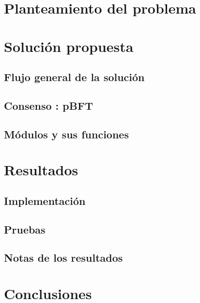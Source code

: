 \documentclass{report}
\begin{document}

    \tableofcontents

    \chapter{\LARGE{Planteamiento del problema}}
    


    \chapter{\LARGE{Solución propuesta}}

    \section{\Large{Flujo general de la solución}}
    

    \section{\Large{Consenso : pBFT}}
    

    \section{\Large{Módulos y sus funciones}}
    
    
    \chapter{\LARGE{Resultados}}

    \section{\Large{Implementación}}
    

    \section{\Large{Pruebas}}
    

    \section{\Large{Notas de los resultados}}
    

    \chapter{\LARGE{Conclusiones}}
    

    \printbibliography
\end{document}
